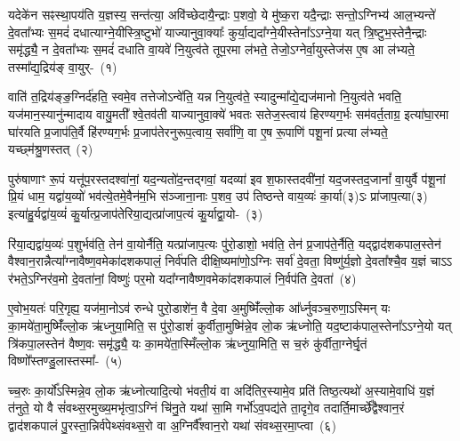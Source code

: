 \setcounter{anuvakam}{0}
यदेके॑न सꣴस्था॒पय॑ति य॒ज्ञस्य॒ सन्त॑त्या॒ अवि॑च्छेदायै॒न्द्राः प॒शवो॒ ये मु॑ष्क॒रा यदै॒न्द्राः सन्तो॒\-ऽग्निभ्य॑ आल॒भ्यन्ते॑ दे॒वता᳚भ्यः स॒मदं॑ दधात्याग्ने॒यीस्त्रि॒ष्टुभो॑ याज्यानुवा॒क्याः᳚ कुर्या॒द्यदा᳚ग्ने॒यीस्तेना᳚\-ऽऽग्ने॒या यत् त्रि॒ष्टुभ॒स्तेनै॒न्द्राः समृ॑द्ध्यै॒ न दे॒वता᳚भ्यः स॒मदं॑ दधाति वा॒यवे॑ नि॒युत्व॑ते तूप॒रमा ल॑भते॒ तेजो॒\-ऽग्नेर्वा॒युस्तेज॑स ए॒ष आ ल॑भ्यते॒ तस्मा᳚द्\-य॒द्रिय॑ङ् वा॒युर्-~(१)\ip

वाति॑ त॒द्रिय॑ङ्ङ॒ग्निर्द॑हति॒ स्वमे॒व तत्तेजो\-ऽन्वे॑ति॒ यन्न नि॒युत्व॑ते॒ स्यादुन्मा᳚द्ये॒द्यज॑मानो नि॒युत्व॑ते भवति॒ यज॑मान॒स्यानु॑न्मादाय वायु॒मती᳚ श्वे॒तव॑ती याज्यानुवा॒क्ये॑ भवतः सतेज॒स्त्वाय॑ हिरण्यग॒र्भः सम॑वर्त॒ताग्र॒ इत्या॑घा॒रमा घा॑रयति प्र॒जा\-प॑ति॒र्वै हि॑रण्यग॒र्भः प्र॒जा\-प॑तेरनुरूप॒त्वाय॒ सर्वा॑णि॒ वा ए॒ष रू॒पाणि॑ पशू॒नां प्रत्या ल॑भ्यते॒ यच्छ्म॑श्रु॒णस्तत्~(२)\ip

पुरु॑षाणाꣳ रू॒पं यत्तू॑प॒रस्तदश्वा॑नां॒ यद॒न्यतो॑द॒न्तद्गवां॒ यदव्या॑ इव श॒फास्तदवी॑नां॒ यद॒जस्तद॒जानां᳚ वा॒युर्वै प॑शू॒नां प्रि॒यं धाम॒ यद्वा॑य॒व्यो॑ भव॑त्ये॒तमे॒वैन॑म॒भि स॑ञ्जाना॒नाः प॒शव॒ उप॑ तिष्ठन्ते वाय॒व्यः॑ का॒र्या(३)ऽः प्रा॑जाप॒त्या(३) इत्या॑हु॒र्यद्वा॑य॒व्यं॑ कु॒र्यात्प्र॒जा\-प॑तेरिया॒द्यत्प्रा॑जाप॒त्यं कु॒र्याद्वा॒यो-~(३)\ip

रि॑या॒द्यद्वा॑य॒व्यः॑ प॒शुर्भव॑ति॒ तेन॑ वा॒योर्नैति॒ यत्प्रा॑जाप॒त्यः पु॑रो॒डाशो॒ भव॑ति॒ तेन॑ प्र॒जा\-प॑ते॒र्नैति॒ यद्द्वाद॑श\-कपाल॒स्तेन॑ वैश्वान॒रान्नैत्या᳚ग्नावैष्ण॒वमेका॑\-दश\-कपालं॒ निर्व॑पति दीक्षि॒ष्यमा॑णो॒\-ऽग्निः सर्वा॑ दे॒वता॒ विष्णु॑र्य॒ज्ञो दे॒वता᳚श्चै॒व य॒ज्ञं चाऽऽ र॑भते॒\-ऽग्निर॑व॒मो दे॒वता॑नां॒ विष्णुः॑ पर॒मो यदा᳚ग्नावैष्ण॒वमेका॑\-दश\-कपालं नि॒र्वप॑ति दे॒वता॑~(४)\ip

ए॒वोभ॒यतः॑ परि॒गृह्य॒ यज॑मा॒नो\-ऽव॑ रुन्धे पुरो॒डाशे॑न॒ वै दे॒वा अ॒मुष्मिँ॑ल्लो॒क आ᳚र्ध्नुवञ्च॒रुणा॒ऽस्मिन् यः का॒मये॑ता॒मुष्मिँ॑ल्लो॒क ऋ॑ध्नुया॒मिति॒ स पु॑रो॒डाशं॑ कुर्वीता॒मुष्मि॑न्ने॒व लो॒क ऋ॑ध्नोति॒ यद॒ष्टाक॑पाल॒स्तेना᳚\-ऽऽग्ने॒यो यत् त्रि॑कपा॒लस्तेन॑ वैष्ण॒वः समृ॑द्ध्यै॒ यः का॒मये॑ता॒स्मिँल्लो॒क ऋ॑ध्नुया॒मिति॒ स च॒रुं कु॑र्वीता॒ग्नेर्घृ॒तं विष्णो᳚स्तण्डु॒लास्तस्मा᳚-~(५)\ip

च्च॒रुः का॒र्यो᳚\-ऽस्मिन्ने॒व लो॒क ऋ॑ध्नोत्यादि॒त्यो भ॑वती॒यं वा अदि॑तिर॒स्यामे॒व प्रति॑ तिष्ठ॒त्यथो॑ अ॒स्यामे॒वाधि॑ य॒ज्ञं त॑नुते॒ यो वै सं॑वथ्स॒रमुख्य॒मभृ॑त्वा॒\-ऽग्निं चि॑नु॒ते यथा॑ सा॒मि गर्भो॑\-ऽव॒पद्य॑ते ता॒दृगे॒व तदार्ति॒मार्च्छे᳚द्वैश्वान॒रं द्वाद॑श\-कपालं पु॒रस्ता॒न्निर्व॑पेथ्संवथ्स॒रो वा अ॒ग्निर्वै᳚श्वान॒रो यथा॑ संवथ्स॒रमा॒प्त्वा~(६)\ip

